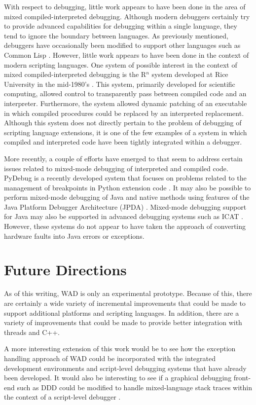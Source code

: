 With respect to debugging, little work appears to have been done in the area of
mixed compiled-interpreted debugging.   Although modern debuggers
certainly try to provide advanced capabilities for debugging within a
single language, they tend to ignore the boundary between languages.
As previously mentioned, debuggers have occasionally been modified to
support other languages such as Common Lisp \cite{wcl}.  However, little work appears
to have been done in the context of modern scripting languages.  One system of possible interest
in the context of mixed compiled-interpreted debugging is the R$^{n}$
system developed at Rice University in the mid-1980's \cite{carle}.  This
system, primarily developed for scientific computing, allowed control
to transparently pass between compiled code and an interpreter.
Furthermore, the system allowed dynamic patching of an executable in
which compiled procedures could be replaced by an interpreted
replacement.  Although this system does not directly pertain to the problem of 
debugging of scripting language extensions, it is one of the few
examples of a system in which compiled and interpreted code have been
tightly integrated within a debugger.

More recently, a couple of efforts have emerged to that seem to
address certain issues related to mixed-mode debugging of interpreted
and compiled code. PyDebug is a recently developed system that focuses
on problems related to the management of breakpoints in Python
extension code \cite{pydebug}.  It may also be possible to perform
mixed-mode debugging of Java and native methods using features of the
Java Platform Debugger Architecture (JPDA) \cite{jpda}.  Mixed-mode
debugging support for Java may also be supported in advanced debugging systems
such as ICAT \cite{icat}.
However, these systems do not appear to have taken the approach of
converting hardware faults into Java errors or exceptions.

\section{Future Directions}

As of this writing, WAD is only an experimental prototype.  Because of
this, there are certainly a wide variety of incremental improvements
that could be made to support additional platforms and scripting
languages. In addition, there are a variety of improvements that could be made
to provide better integration with threads and C++.

A more interesting extension of this work would be to see how the
exception handling approach of WAD could be incorporated with
the integrated development environments and script-level debugging
systems that have already been developed.  It would also be interesting
to see if a graphical debugging front-end such as DDD could be modified
to handle mixed-language stack traces within the context of a script-level debugger \cite{ddd}.   

